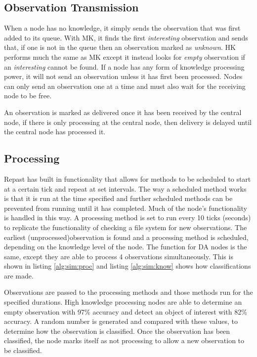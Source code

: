 \subsection{Observation Transmission}
When a node has no knowledge, it simply sends the observation that was first added to its queue. With MK, it finds the first \textit{interesting} observation and sends that, if one is not in the queue then an observation marked as \textit{unknown}. HK performs much the same as MK except it instead looks for \textit{empty} observation if an \textit{interesting} cannot be found. If a node has any form of knowledge processing power, it will not send an observation unless it has first been processed. Nodes can only send an observation one at a time and must also wait for the receiving node to be free.

An observation is marked as delivered once it has been received by the central node, if there is only processing at the central node, then delivery is delayed until the central node has processed it.

\subsection{Processing}
Repast has built in functionality that allows for methods to be scheduled to start at a certain tick and repeat at set intervals. The way a scheduled method works is that it is run at the time specified and further scheduled methods can be prevented from running until it has completed. Much of the node's functionality is handled in this way. A processing method is set to run every 10 ticks (seconds) to replicate the functionality of checking a file system for new observations. The earliest (unprocessed)observation is found and a processing method is scheduled, depending on the knowledge level of the node. The function for DA nodes is the same, except they are able to process 4 observations simultaneously. This is shown in listing \ref{alg:sim:proc} and listing \ref{alg:sim:know} shows how classifications are made. 

Observations are passed to the processing methods and those methods run for the specified durations. High knowledge processing nodes are able to determine an empty observation with 97\% accuracy and detect an object of interest with 82\% accuracy. A random number is generated and compared with these values, to determine how the observation is classified. Once the observation has been classified, the node marks itself as not processing to allow a new observation to be classified. 


